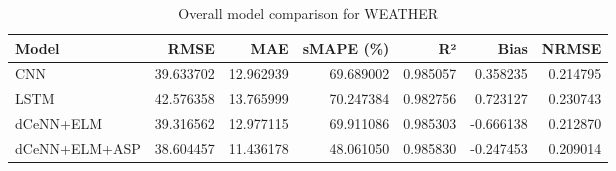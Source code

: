 \begin{table}
\caption{Overall model comparison for WEATHER}
\begin{tabular}{lrrrrrr}
\toprule
Model & RMSE & MAE & sMAPE (\%) & R² & Bias & NRMSE \\
\midrule
CNN & 39.633702 & 12.962939 & 69.689002 & 0.985057 & 0.358235 & 0.214795 \\
LSTM & 42.576358 & 13.765999 & 70.247384 & 0.982756 & 0.723127 & 0.230743 \\
dCeNN+ELM & 39.316562 & 12.977115 & 69.911086 & 0.985303 & -0.666138 & 0.212870 \\
dCeNN+ELM+ASP & 38.604457 & 11.436178 & 48.061050 & 0.985830 & -0.247453 & 0.209014 \\
\bottomrule
\end{tabular}
\end{table}
